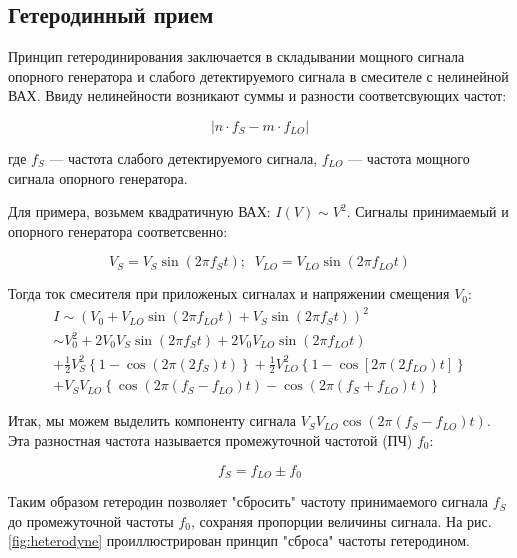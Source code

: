 \documentclass[a4paper]{article}
\begin{document}
\subsection{Гетеродинный прием}

Принцип гетеродинирования \cite{Barichev} заключается в складывании мощного сигнала опорного генератора и слабого детектируемого сигнала в смесителе с нелинейной ВАХ. Ввиду нелинейности возникают суммы и разности соответсвующих частот:

\begin{equation}
    |n\cdot f_S - m \cdot f_{LO}|
\end{equation}

где $f_S$ — частота слабого детектируемого сигнала, $f_{LO}$ — частота мощного сигнала опорного генератора.

Для примера, возьмем квадратичную ВАХ: $I(V) \sim V^2$. Сигналы принимаемый и опорного генератора соответсвенно:

\begin{equation}
    V_S = V_S \sin(2\pi f_S t); \;\;  V_{LO} = V_{LO} \sin(2\pi f_{LO} t)
\end{equation}

Тогда ток смесителя при приложеных сигналах и напряжении смещения $V_0$:
\begin{equation}
    \begin{split}
       I \sim \left ( V_0 +  V_{LO} \sin(2\pi f_{LO} t) + V_S \sin(2\pi f_S t)  \right )^2 \\
       \sim V_0^2 + 2V_0V_S \sin(2\pi f_S t) + 2V_0V_{LO} \sin(2\pi f_{LO}t) \\
        + \frac{1}{2} V_S^2 \left \{ 1 - \cos(2\pi (2f_S)t) \right \}
        + \frac{1}{2} V_{LO}^2 \left \{ 1 - \cos[2\pi (2f_{LO})t] \right \} \\
        + V_S V_{LO} \left \{ \cos(2\pi (f_S - f_{LO})t) - \cos(2\pi (f_S + f_{LO})t) \right \}
    \end{split}
\end{equation}

Итак, мы можем выделить компоненту сигнала $V_S V_{LO} \cos(2\pi(f_S - f_{LO}) t)$. Эта разностная частота называется промежуточной частотой (ПЧ) $f_0$:

\begin{equation}
    f_S = f_{LO} \pm f_0
\end{equation}

Таким образом гетеродин позволяет "сбросить" частоту принимаемого сигнала $f_S$ до промежуточной частоты $f_0$, сохраняя пропорции величины сигнала. На рис. \ref{fig:heterodyne} проиллюстрирован принцип "сброса" частоты гетеродином.
\end{document}
